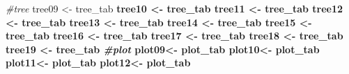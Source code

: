 \documentclass[
]{article}
\newenvironment{Shaded}{\begin{snugshade}}{\end{snugshade}}
\newcommand{\CommentTok}[1]{\textcolor[rgb]{0.56,0.35,0.01}{\textit{#1}}}
\newcommand{\DecValTok}[1]{\textcolor[rgb]{0.00,0.00,0.81}{#1}}
\newcommand{\KeywordTok}[1]{\textcolor[rgb]{0.13,0.29,0.53}{\textbf{#1}}}
\newcommand{\NormalTok}[1]{#1}
\newcommand{\OperatorTok}[1]{\textcolor[rgb]{0.81,0.36,0.00}{\textbf{#1}}}
\newcommand{\StringTok}[1]{\textcolor[rgb]{0.31,0.60,0.02}{#1}}
\begin{document}
\begin{Shaded}
\begin{Highlighting}[]
\CommentTok{#tree}
\NormalTok{tree09 <-}\StringTok{ }\NormalTok{tree_tab }\OperatorTok{%>%}\StringTok{ }\KeywordTok{subset}\NormalTok{(INVYR}\OperatorTok{==}\DecValTok{2009}\NormalTok{)}
\NormalTok{tree10 <-}\StringTok{ }\NormalTok{tree_tab }\OperatorTok{%>%}\StringTok{ }\KeywordTok{subset}\NormalTok{(INVYR}\OperatorTok{==}\DecValTok{2010}\NormalTok{)}
\NormalTok{tree11 <-}\StringTok{ }\NormalTok{tree_tab }\OperatorTok{%>%}\StringTok{ }\KeywordTok{subset}\NormalTok{(INVYR}\OperatorTok{==}\DecValTok{2011}\NormalTok{)}
\NormalTok{tree12 <-}\StringTok{ }\NormalTok{tree_tab }\OperatorTok{%>%}\StringTok{ }\KeywordTok{subset}\NormalTok{(INVYR}\OperatorTok{==}\DecValTok{2012}\NormalTok{)}
\NormalTok{tree13 <-}\StringTok{ }\NormalTok{tree_tab }\OperatorTok{%>%}\StringTok{ }\KeywordTok{subset}\NormalTok{(INVYR}\OperatorTok{==}\DecValTok{2013}\NormalTok{)}
\NormalTok{tree14 <-}\StringTok{ }\NormalTok{tree_tab }\OperatorTok{%>%}\StringTok{ }\KeywordTok{subset}\NormalTok{(INVYR}\OperatorTok{==}\DecValTok{2014}\NormalTok{)}
\NormalTok{tree15 <-}\StringTok{ }\NormalTok{tree_tab }\OperatorTok{%>%}\StringTok{ }\KeywordTok{subset}\NormalTok{(INVYR}\OperatorTok{==}\DecValTok{2015}\NormalTok{)}
\NormalTok{tree16 <-}\StringTok{ }\NormalTok{tree_tab }\OperatorTok{%>%}\StringTok{ }\KeywordTok{subset}\NormalTok{(INVYR}\OperatorTok{==}\DecValTok{2016}\NormalTok{)}
\NormalTok{tree17 <-}\StringTok{ }\NormalTok{tree_tab }\OperatorTok{%>%}\StringTok{ }\KeywordTok{subset}\NormalTok{(INVYR}\OperatorTok{==}\DecValTok{2017}\NormalTok{)}
\NormalTok{tree18 <-}\StringTok{ }\NormalTok{tree_tab }\OperatorTok{%>%}\StringTok{ }\KeywordTok{subset}\NormalTok{(INVYR}\OperatorTok{==}\DecValTok{2018}\NormalTok{)}
\NormalTok{tree19 <-}\StringTok{ }\NormalTok{tree_tab }\OperatorTok{%>%}\StringTok{ }\KeywordTok{subset}\NormalTok{(INVYR}\OperatorTok{==}\DecValTok{2019}\NormalTok{)}
\CommentTok{#plot}
\NormalTok{plot09<-}\StringTok{ }\NormalTok{plot_tab }\OperatorTok{%>%}\StringTok{ }\KeywordTok{subset}\NormalTok{(INVYR}\OperatorTok{==}\DecValTok{2009}\NormalTok{)}
\NormalTok{plot10<-}\StringTok{ }\NormalTok{plot_tab }\OperatorTok{%>%}\StringTok{ }\KeywordTok{subset}\NormalTok{(INVYR}\OperatorTok{==}\DecValTok{2010}\NormalTok{)}
\NormalTok{plot11<-}\StringTok{ }\NormalTok{plot_tab }\OperatorTok{%>%}\StringTok{ }\KeywordTok{subset}\NormalTok{(INVYR}\OperatorTok{==}\DecValTok{2011}\NormalTok{)}
\NormalTok{plot12<-}\StringTok{ }\NormalTok{plot_tab }\OperatorTok{%>%}\StringTok{ }\KeywordTok{subset}\NormalTok{(INVYR}\OperatorTok{==}\DecValTok{2012}\NormalTok{)}
}}}}}}}}}}}}}}}
\end{Highlighting}
\end{Shaded}
\end{document}

